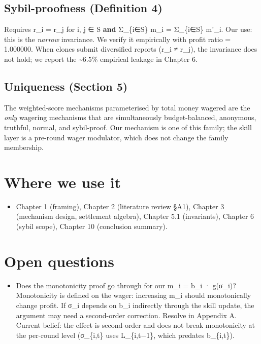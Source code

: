 \documentclass[11pt,a4paper,openany]{report}
\begin{document}
\subsection{Sybil-proofness (Definition 4)}

Requires r\_i = r\_j for i, j ∈ S \textbf{and} Σ\_\{i∈S\} m\_i = Σ\_\{i∈S\} m'\_i. Our
use: this is the \emph{narrow} invariance. We verify it empirically with
profit ratio = 1.000000. When clones submit diversified reports (r\_i ≠
r\_j), the invariance does not hold; we report the \textasciitilde{}6.5\% empirical
leakage in Chapter 6.

\subsection{Uniqueness (Section 5)}

The weighted-score mechanisms parameterised by total money wagered are
the \emph{only} wagering mechanisms that are simultaneously budget-balanced,
anonymous, truthful, normal, and sybil-proof. Our mechanism is one of
this family; the skill layer is a pre-round wager modulator, which
does not change the family membership.

\section{Where we use it}

\begin{itemize}
  \item Chapter 1 (framing), Chapter 2 (literature review §A1), Chapter 3
    (mechanism design, settlement algebra), Chapter 5.1 (invariants),
    Chapter 6 (sybil scope), Chapter 10 (conclusion summary).
\end{itemize}

\section{Open questions}

\begin{itemize}
  \item Does the monotonicity proof go through for our m\_i = b\_i · g(σ\_i)?
    Monotonicity is defined on the wager: increasing m\_i should
    monotonically change profit. If σ\_i depends on b\_i indirectly
    through the skill update, the argument may need a second-order
    correction. Resolve in Appendix A. Current belief: the effect is
    second-order and does not break monotonicity at the per-round
    level (σ\_\{i,t\} uses L\_\{i,t−1\}, which predates b\_\{i,t\}).
\end{itemize}
\end{document}
